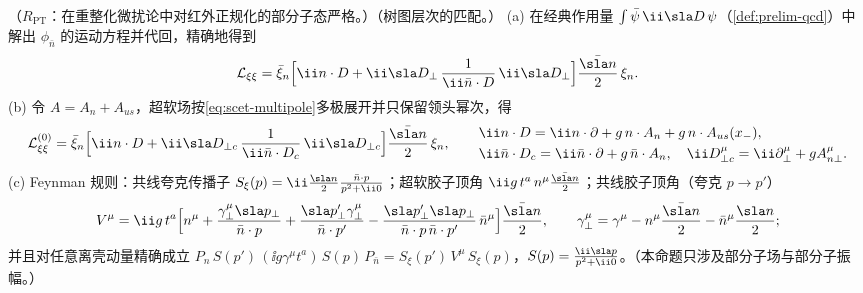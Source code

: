 \begin{proposition}\label{prop:scet-lagrangian}
（$R_{\mathrm{PT}}$：在重整化微扰论中对红外正规化的部分子态严格。）（树图层次的匹配。）
(a) 在经典作用量 $\int\bar\psi\,\ii\sla D\,\psi$（\cref{def:prelim-qcd}）中解出 $\phi_{\bar n}$ 的运动方程并代回，精确地得到
\begin{equation}\label{eq:scet-Lxixi-exact}
\mathcal L_{\xi\xi}=\bar\xi_n\Big[\ii n\cdot D+\ii\sla D_\perp\,\frac{1}{\ii\bar n\cdot D}\,\ii\sla D_\perp\Big]\frac{\bar{\sla n}}{2}\,\xi_n .
\end{equation}
(b) 令 $A=A_n+A_{us}$，超软场按\cref{eq:scet-multipole}多极展开并只保留领头幂次，得
\begin{equation}\label{eq:scet-L0xi}
\mathcal L^{(0)}_{\xi\xi}=\bar\xi_n\Big[\ii n\cdot D+\ii\sla D_{\perp c}\,\frac{1}{\ii\bar n\cdot D_c}\,\ii\sla D_{\perp c}\Big]\frac{\bar{\sla n}}{2}\,\xi_n,\qquad
\begin{aligned}
&\ii n\cdot D=\ii n\cdot\partial+g\,n\cdot A_n+g\,n\cdot A_{us}(x_-),\\
&\ii\bar n\cdot D_c=\ii\bar n\cdot\partial+g\,\bar n\cdot A_n,\quad \ii D^\mu_{\perp c}=\ii\partial^\mu_\perp+gA^\mu_{n\perp}.
\end{aligned}
\end{equation}
(c) Feynman 规则：共线夸克传播子 $S_\xi(p)=\ii\frac{\sla n}{2}\frac{\bar n\cdot p}{p^2+\ii0}$；超软胶子顶角 $\ii g\,t^a\,n^\mu\frac{\bar{\sla n}}{2}$；共线胶子顶角（夸克 $p\to p'$）
\begin{equation}\label{eq:scet-collvertex}
V^\mu=\ii g\,t^a\Big[n^\mu+\frac{\gamma_\perp^\mu\sla p_\perp}{\bar n\cdot p}+\frac{\sla p'_\perp\gamma_\perp^\mu}{\bar n\cdot p'}-\frac{\sla p'_\perp\sla p_\perp}{\bar n\cdot p\,\bar n\cdot p'}\,\bar n^\mu\Big]\frac{\bar{\sla n}}{2},\qquad
\gamma_\perp^\mu=\gamma^\mu-n^\mu\frac{\bar{\sla n}}{2}-\bar n^\mu\frac{\sla n}{2};
\end{equation}
并且对任意离壳动量精确成立 $P_n\,S(p')\,(\ii g\gamma^\mu t^a)\,S(p)\,P_{\bar n}=S_\xi(p')\,V^\mu\,S_\xi(p)$，$S(p)=\frac{\ii\sla p}{p^2+\ii0}$。（本命题只涉及部分子场与部分子振幅。）
\end{proposition}

